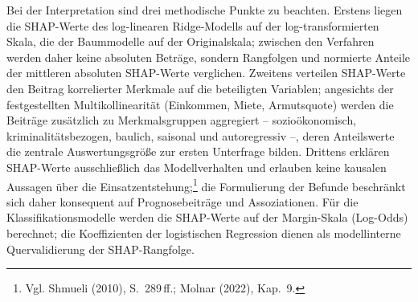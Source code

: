 Bei der Interpretation sind drei methodische Punkte zu beachten. Erstens
liegen die SHAP-Werte des log-linearen Ridge-Modells auf der
log-transformierten Skala, die der Baummodelle auf der Originalskala;
zwischen den Verfahren werden daher keine absoluten Beträge, sondern
Rangfolgen und normierte Anteile der mittleren absoluten SHAP-Werte
verglichen. Zweitens verteilen SHAP-Werte den Beitrag korrelierter Merkmale
auf die beteiligten Variablen; angesichts der festgestellten
Multikollinearität (Einkommen, Miete, Armutsquote) werden die Beiträge
zusätzlich zu Merkmalsgruppen aggregiert -- sozioökonomisch,
kriminalitätsbezogen, baulich, saisonal und autoregressiv --, deren
Anteilswerte die zentrale Auswertungsgröße zur ersten Unterfrage bilden.
Drittens erklären SHAP-Werte ausschließlich das Modellverhalten und erlauben
keine kausalen Aussagen über die Einsatzentstehung;\footnote{Vgl. Shmueli
(2010), S.~289\,ff.; Molnar (2022), Kap.~9.} die Formulierung der Befunde
beschränkt sich daher konsequent auf Prognosebeiträge und Assoziationen. Für
die Klassifikationsmodelle werden die SHAP-Werte auf der Margin-Skala
(Log-Odds) berechnet; die Koeffizienten der logistischen Regression dienen
als modellinterne Quervalidierung der SHAP-Rangfolge.

